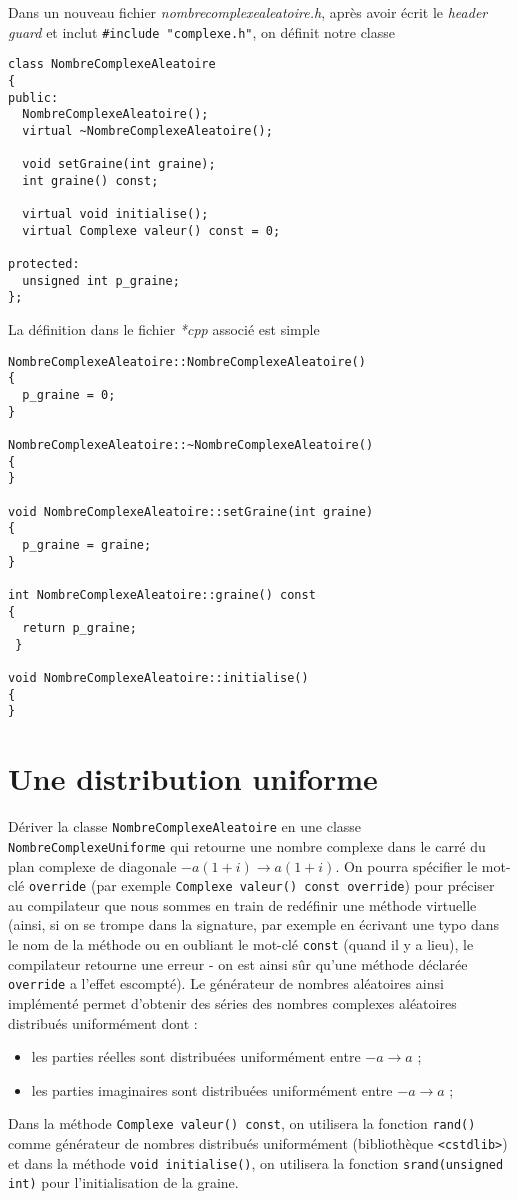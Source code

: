 \documentclass{book}
\newcommand{\inline}[1]{\texttt{#1}}
\def\filename{\emph}
\begin{document}
\begin{correction}
Dans un nouveau fichier \filename{nombrecomplexealeatoire.h}, après avoir écrit le \emph{header guard} et inclut \texttt{#include "complexe.h"}, on définit notre classe 
\begin{verbatim}
class NombreComplexeAleatoire
{
public:
  NombreComplexeAleatoire();
  virtual ~NombreComplexeAleatoire();

  void setGraine(int graine);
  int graine() const;
  
  virtual void initialise();
  virtual Complexe valeur() const = 0;
  
protected:
  unsigned int p_graine;
};
\end{verbatim}

La définition dans le fichier \emph{*cpp} associé est simple
\begin{verbatim}
NombreComplexeAleatoire::NombreComplexeAleatoire()
{
  p_graine = 0;
}

NombreComplexeAleatoire::~NombreComplexeAleatoire()
{
}

void NombreComplexeAleatoire::setGraine(int graine)
{
  p_graine = graine;
}

int NombreComplexeAleatoire::graine() const
{
  return p_graine;
 }

void NombreComplexeAleatoire::initialise()
{
}
\end{verbatim}
\end{correction}

\section{Une distribution uniforme}
Dériver la classe \inline{NombreComplexeAleatoire} en une classe \inline{NombreComplexeUniforme} qui retourne une nombre complexe dans le carré du plan complexe de diagonale $-a(1+i) \to a(1+i)$. On pourra spécifier le mot-clé \inline{override} (par exemple \inline{Complexe valeur() const override}) pour préciser au compilateur que nous sommes en train de redéfinir une méthode virtuelle (ainsi, si on se trompe dans la signature, par exemple en écrivant une typo dans le nom de la méthode ou en oubliant le mot-clé \inline{const} (quand il y a lieu), le compilateur retourne une erreur - on est ainsi sûr qu'une méthode déclarée \inline{override} a l'effet escompté). Le générateur de nombres aléatoires ainsi implémenté permet d'obtenir des séries des nombres complexes aléatoires distribués uniformément dont :
\begin{itemize}
\item les parties réelles sont distribuées uniformément entre $-a \to a$ ;
\item les parties imaginaires sont distribuées uniformément entre $-a \to a$ ;
\end{itemize}
Dans la méthode \inline{Complexe valeur() const}, on utilisera la fonction \inline{rand()} comme générateur de nombres distribués uniformément (bibliothèque \inline{<cstdlib>}) et dans la méthode \inline{void initialise()}, on utilisera la fonction \inline{srand(unsigned int)} pour l'initialisation de la graine.
\end{document}

